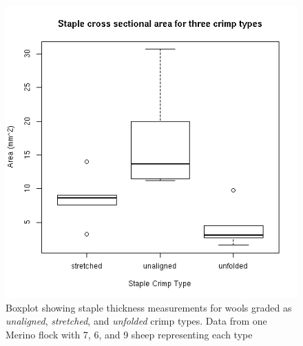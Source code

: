 %

\begin{figure}[!h]
  \centering
  \includegraphics[width=1.1\textwidth]{stapthick.png}
  \caption{Boxplot showing staple thickness measurements for wools graded as {\em unaligned}, {\em stretched}, and {\em unfolded} crimp types. Data from one Merino flock with 7, 6, and 9 sheep representing each type}
  \label{fig:stapthick}
\end{figure}

%


